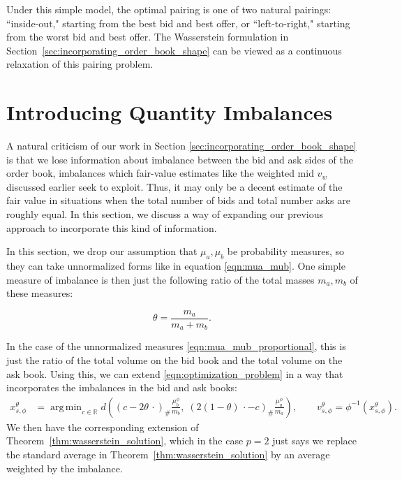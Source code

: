 \documentclass[11pt]{article}
\theoremstyle{plain}
\theoremstyle{definition}
\numberwithin{equation}{section}
\DeclareMathOperator*{\argmin}{arg\,min}
\begin{document}
Under this simple model, the optimal pairing is one of two natural pairings:
``inside-out," starting from the best bid and best offer, or ``left-to-right,"
starting from the worst bid and best offer. The Wasserstein formulation in
Section~\ref{sec:incorporating_order_book_shape} can be viewed as a continuous
relaxation of this pairing problem.


\section{Introducing Quantity Imbalances}
\label{sec:quantity_imbalances}

A natural criticism of our work in Section \ref{sec:incorporating_order_book_shape}
 is that we lose information about imbalance between the bid and ask
  sides of the order book, imbalances which fair-value estimates
  like the weighted mid $v_w$ discussed earlier seek to exploit.
  Thus, it may only be a decent estimate of the fair value in
  situations when the total number of bids and total number asks
   are roughly equal. In this section, we discuss a way of expanding
   our previous approach to incorporate this kind of information.

In this section, we drop our assumption that $\mu_a, \mu_b$ be
probability measures, so they can take unnormalized forms like in
equation \eqref{eqn:mua_mub}. One simple measure of imbalance is
then just the following ratio of the total masses $m_a, m_b$ of
these measures:
%

\begin{equation}
    \theta = \frac{m_a}{m_a + m_b}.
    \label{eqn:imbalance_ratio_theta}
\end{equation}

%

\noindent In the case of the unnormalized measures
\eqref{eqn:mua_mub_proportional}, this is just the ratio of the total
volume on the bid book and the total volume on the ask book.
Using this, we can extend \eqref{eqn:optimization_problem} in a way
 that incorporates the imbalances in the bid and ask books:
%
\begin{align}
        x_{s,\phi}^\theta & = \argmin_{c \in \mathbb R}
        d\left((c-2\theta\,\cdot)_\#\frac{\mu_b^\phi}{m_b},\;
        (2(1-\theta)\,\cdot-c)_\#\frac{\mu_a^\phi}{m_a}\right),
        \qquad v_{s,\phi}^\theta=\phi^{-1}(x_{s,\phi}^\theta).
        \label{eqn:imbalanced_optimization_problem}
\end{align}
%
\noindent We then have the corresponding extension of
Theorem~\ref{thm:wasserstein_solution}, which in the case $p=2$
just says we replace the standard average in
Theorem~\ref{thm:wasserstein_solution} by an average weighted
 by the imbalance.
\end{document}
